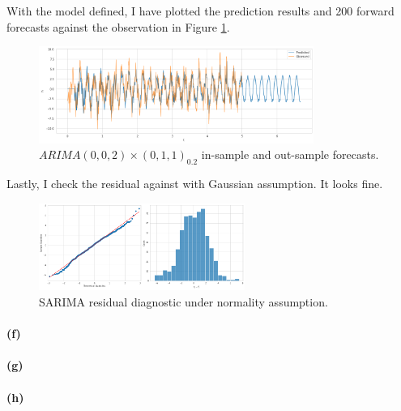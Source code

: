 \documentclass[11pt, letterpaper]{article}
\begin{document}
With the model defined, I have plotted the prediction results and 200 forward forecasts against the observation in Figure \ref{fig:sarima_forecast}.
\begin{figure}[!h]
  \centering
  \includegraphics[width=0.8\textwidth]{plot5.png}
  \captionsetup{justification=centering}
  \caption{$ARIMA(0,0,2) \times (0,1,1)_{0.2}$ in-sample and out-sample forecasts.}
  \label{fig:sarima_forecast}
\end{figure}

Lastly, I check the residual against with Gaussian assumption. It looks fine.
\begin{figure}[!h]
  \centering
  \includegraphics[width=0.6\textwidth]{plot6.png}
  \captionsetup{justification=centering}
  \caption{SARIMA residual diagnostic under normality assumption.}
  \label{fig:sarima_diagnostic}
\end{figure}

\paragraph{(f)}

\paragraph{(g)}
\paragraph{(h)}
\end{document}
